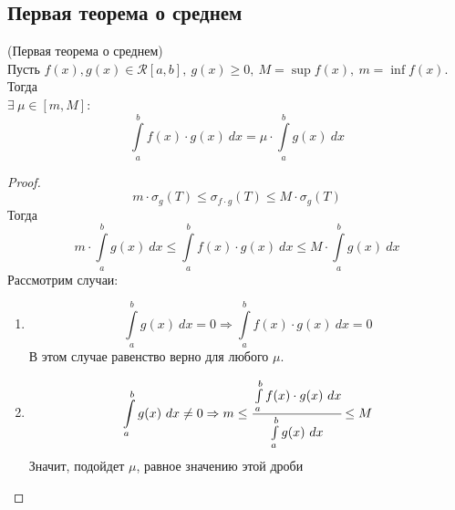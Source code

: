 \subsection{Первая теорема о среднем}

\begin{theorem} (Первая теорема о среднем)\\
    Пусть $f(x), g(x) \in \mathcal{R}[a, b],\ g(x) \geq 0,\ M = \sup f(x),\ m = \inf f(x)$. Тогда\\
    $\exists\ \mu\in [m,M]$:
    \[\int\limits_{a}^{b}f(x)\cdot g(x)\ dx = \mu\cdot\int\limits_{a}^{b}g(x)\ dx\]
\end{theorem}
\begin{proof}
    \[m\cdot \sigma_g(T) \leq \sigma_{f\cdot g}(T) \leq M\cdot\sigma_g(T)\]
    Тогда
    \[m\cdot \int\limits_{a}^{b} g(x)\ dx \leq \int\limits_{a}^{b} f(x)\cdot g(x)\ dx \leq M\cdot\int\limits_{a}^{b} g(x)\ dx\]
    Рассмотрим случаи:
    \begin{enumerate}
        \item 
        \[\int\limits_{a}^{b} g(x)\ dx = 0 \Rightarrow \int\limits_{a}^{b} f(x)\cdot g(x)\ dx = 0\]
        В этом случае равенство верно для любого $\mu$.
        \item
        \[\int\limits_{a}^{b} g(x)\ dx \ne 0 \Rightarrow m\leq \cfrac{\int\limits_{a}^{b} f(x)\cdot g(x)\ dx}{\int\limits_{a}^{b} g(x)\ dx}\leq M\]
        Значит, подойдет $\mu$, равное значению этой дроби
    \end{enumerate}
\end{proof}
